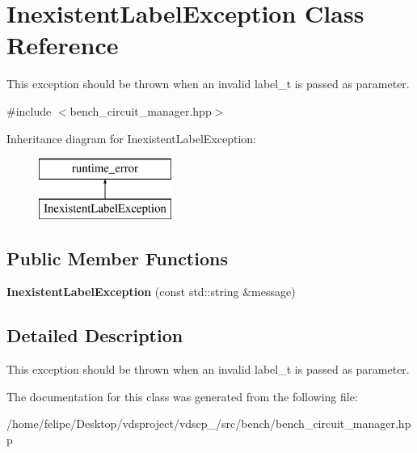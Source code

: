 \section{Inexistent\+Label\+Exception Class Reference}
\label{classInexistentLabelException}


This exception should be thrown when an invalid label\+\_\+t is passed as parameter.  




{\ttfamily \#include $<$bench\+\_\+circuit\+\_\+manager.\+hpp$>$}

Inheritance diagram for Inexistent\+Label\+Exception\+:\begin{figure}[H]
\begin{center}
\leavevmode
\includegraphics[height=2.000000cm]{classInexistentLabelException}
\end{center}
\end{figure}
\subsection*{Public Member Functions}
\begin{DoxyCompactItemize}
\item 
{\bfseries Inexistent\+Label\+Exception} (const std\+::string \&message)\label{classInexistentLabelException_a10aad583eea5fb78eb56695b80a8da27}

\end{DoxyCompactItemize}


\subsection{Detailed Description}
This exception should be thrown when an invalid label\+\_\+t is passed as parameter. 

The documentation for this class was generated from the following file\+:\begin{DoxyCompactItemize}
\item 
/home/felipe/\+Desktop/vdsproject/vdscp\+\_/src/bench/bench\+\_\+circuit\+\_\+manager.\+hpp\end{DoxyCompactItemize}
